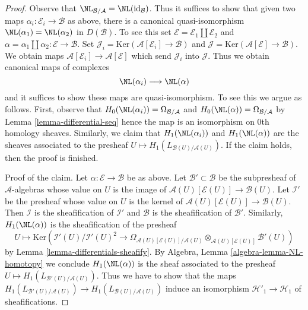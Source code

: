 \begin{proof}
Observe that $\NL_{\mathcal{B}/\mathcal{A}} = \NL(\text{id}_\mathcal{B})$.
Thus it suffices to show that given two maps
$\alpha_i : \mathcal{E}_i \to \mathcal{B}$ as above, there is a
canonical quasi-isomorphism $\NL(\alpha_1) = \NL(\alpha_2)$ in $D(\mathcal{B})$.
To see this set $\mathcal{E} = \mathcal{E}_1 \amalg \mathcal{E}_2$ and
$\alpha = \alpha_1 \amalg \alpha_2 : \mathcal{E} \to \mathcal{B}$.
Set
$\mathcal{J}_i = \text{Ker}(\mathcal{A}[\mathcal{E}_i] \to \mathcal{B})$
and
$\mathcal{J} = \text{Ker}(\mathcal{A}[\mathcal{E}] \to \mathcal{B})$.
We obtain maps $\mathcal{A}[\mathcal{E}_i] \to \mathcal{A}[\mathcal{E}]$
which send $\mathcal{J}_i$ into $\mathcal{J}$.
Thus we obtain canonical maps of complexes
$$
\NL(\alpha_i) \longrightarrow \NL(\alpha)
$$
and it suffices to show these maps are quasi-isomorphism. To see this
we argue as follows. First, observe that
$H_0(\NL(\alpha_i)) = \Omega_{\mathcal{B}/\mathcal{A}}$ and
$H_0(\NL(\alpha)) = \Omega_{\mathcal{B}/\mathcal{A}}$ by
Lemma \ref{lemma-differential-seq}
hence the map is an isomorphism on $0$th homology sheaves.
Similarly, we claim that $H_1(\NL(\alpha_i))$ and $H_1(\NL(\alpha))$
are the sheaves associated to the presheaf
$U \mapsto H_1(L_{\mathcal{B}(U)/\mathcal{A}(U)})$.
If the claim holds, then the proof is finished.

\medskip\noindent
Proof of the claim. Let $\alpha : \mathcal{E} \to \mathcal{B}$
be as above. Let $\mathcal{B}' \subset \mathcal{B}$ be the subpresheaf
of $\mathcal{A}$-algebras whose value on $U$ is the image of
$\mathcal{A}(U)[\mathcal{E}(U)] \to \mathcal{B}(U)$. Let $\mathcal{I}'$
be the presheaf whose value on $U$ is the kernel of
$\mathcal{A}(U)[\mathcal{E}(U)] \to \mathcal{B}(U)$. Then $\mathcal{I}$
is the sheafification of $\mathcal{I}'$ and $\mathcal{B}$ is
the sheafification of $\mathcal{B}'$. Similarly,
$H_1(\NL(\alpha))$ is the sheafification of the presheaf
$$
U \longmapsto
\text{Ker}(\mathcal{I}'(U)/\mathcal{I}'(U)^2 \to
\Omega_{\mathcal{A}(U)[\mathcal{E}(U)]/\mathcal{A}(U)}
\otimes_{\mathcal{A}(U)[\mathcal{E}(U)]} \mathcal{B}'(U))
$$
by Lemma \ref{lemma-differentials-sheafify}.
By Algebra, Lemma \ref{algebra-lemma-NL-homotopy} we conclude
$H_1(\NL(\alpha))$ is the sheaf associated to the presheaf
$U \mapsto H_1(L_{\mathcal{B}'(U)/\mathcal{A}(U)})$. Thus we have
to show that the maps
$H_1(L_{\mathcal{B}'(U)/\mathcal{A}(U)}) \to
H_1(L_{\mathcal{B}(U)/\mathcal{A}(U)})$ induce an isomorphism
$\mathcal{H}'_1 \to \mathcal{H}_1$ of sheafifications.


\end{proof}
